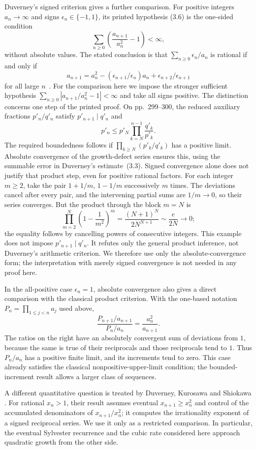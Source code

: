 \documentclass[11pt]{article}
\begin{document}
Duverney's signed criterion gives a further comparison. For positive
integers $a_n\to\infty$ and signs $\epsilon_n\in\{-1,1\}$, its printed
hypothesis (3.6) is the one-sided condition
\[
 \sum_{n\ge0}\left(\frac{a_{n+1}}{a_n^2}-1\right)<\infty,
\]
without absolute values. The stated conclusion is that
$\sum_{n\ge0}\epsilon_n/a_n$ is rational if and only if
\[
 a_{n+1}=a_n^2-(\epsilon_{n+1}/\epsilon_n)a_n
             +\epsilon_{n+2}/\epsilon_{n+1}
\]
for all large $n$~\cite[Corollary~3.2, p.~287]{duverney2001}.
For the comparison here we impose the stronger sufficient hypothesis
$\sum_{n\ge0}|a_{n+1}/a_n^2-1|<\infty$ and take all signs positive.
The distinction concerns one step of the printed proof. On pp.~299--300,
the reduced auxiliary fractions $p'_n/q'_n$ satisfy
$p'_{n+1}\mid q'_n$ and
\[
 p'_n\le p'_N\prod_{k=N}^{n-1}\frac{q'_k}{p'_k}.
\]
The required boundedness follows if
$\prod_{k\ge N}(p'_k/q'_k)$ has a positive limit. Absolute convergence
of the growth-defect series ensures this, using the summable error in
Duverney's estimate~(3.3). Signed convergence alone does not justify
that product step, even for positive rational factors. For each integer
$m\ge2$, take the pair $1+1/m$, $1-1/m$ successively $m$ times.
The deviations cancel after every pair, and the intervening partial sums
are $1/m\to0$, so their series converges. But the product through the
block $m=N$ is
\[
 \prod_{m=2}^{N}\left(1-\frac1{m^2}\right)^m
 =\frac{(N+1)^N}{2N^{N+1}}\sim\frac e{2N}\longrightarrow0;
\]
the equality follows by cancelling powers of consecutive integers.
This example does not impose $p'_{n+1}\mid q'_n$. It refutes only the
general product inference, not Duverney's arithmetic criterion.
We therefore use only the absolute-convergence form; the interpretation
with merely signed convergence is not needed in any proof here.

In the all-positive case $\epsilon_n=1$, absolute convergence also gives a
direct comparison with the classical product criterion. With the
one-based notation $P_n=\prod_{1\le j<n}a_j$ used above,
\[
 \frac{P_{n+1}/a_{n+1}}{P_n/a_n}=\frac{a_n^2}{a_{n+1}}.
\]
The ratios on the right have an absolutely convergent sum of deviations
from $1$, because the same is true of their reciprocals and those
reciprocals tend to $1$. Thus $P_n/a_n$ has a positive finite limit,
and its increments tend to zero. This case already satisfies the
classical nonpositive-upper-limit condition; the bounded-increment
result allows a larger class of sequences.

A different quantitative question is treated by Duverney, Kurosawa and
Shiokawa \cite[Theorem~1, author-version p.~2; proof in Section~3]{duverneykurosawashiokawa2020}.
For rational $x_n>1$, their result assumes eventual $x_{n+1}\ge x_n^2$
and control of the accumulated denominators of $x_{n+1}/x_n^2$; it computes
the irrationality exponent of a signed reciprocal series. We use it only as
a restricted comparison. In particular, the eventual Sylvester recurrence and the cubic rate
considered here approach quadratic growth from the other side.
\end{document}
